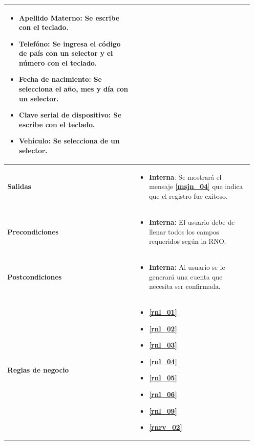 \begin{center}
\begin{longtable}{| p{3.5cm} | p{11.5cm} |}
\begin{itemize}
              \item \textbf{Apellido Materno}: Se escribe con el teclado.
              \item \textbf{Telefóno}: Se ingresa el código de país con un selector y el número con el teclado.
              \item \textbf{Fecha de nacimiento}: Se selecciona el año, mes y día con un selector.
              \item \textbf{Clave serial de dispositivo}: Se escribe con el teclado.
              \item \textbf{Vehículo}: Se selecciona de un selector.
            \end{itemize} \\
        \hline	
          \textbf{Salidas} &  
          \begin{itemize}
              \item \textbf{Interna}: Se mostrará el mensaje \textbf{\ref{msjn_04}} que indica que el registro fue exitoso.
            \end{itemize} \\
        \hline	
          \textbf{Precondiciones}& 
            \begin{itemize}
              \item \textbf{Interna:} El usuario debe de llenar todos los campos requeridos según la RNO.
            \end{itemize} \\
        \hline	
          \textbf{Postcondiciones} & 
            \begin{itemize}
              \item \textbf{Interna:} Al usuario se le generará una cuenta que necesita ser confirmada.
            \end{itemize} \\
        \hline    
           \textbf{Reglas de negocio} & 
             \begin{itemize}
               \item \textbf{\ref{rnl_01}}
               \item \textbf{\ref{rnl_02}}
               \item \textbf{\ref{rnl_03}}
               \item \textbf{\ref{rnl_04}}
               \item \textbf{\ref{rnl_05}}
               \item \textbf{\ref{rnl_06}}
               \item \textbf{\ref{rnl_09}}
               \item \textbf{\ref{rnrv_02}}

\end{itemize}
\end{longtable}
\end{center}
